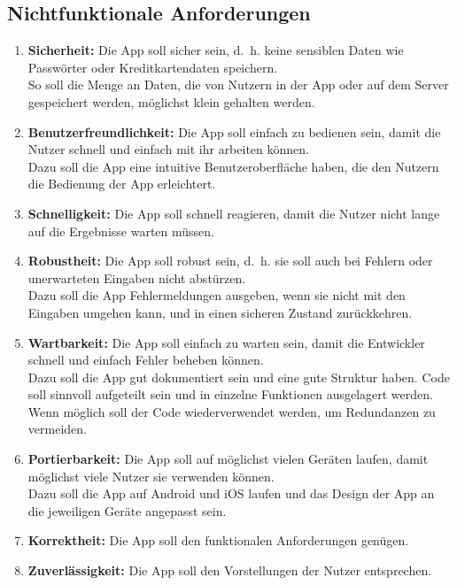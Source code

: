 \subsection{Nichtfunktionale Anforderungen}

\begin{enumerate}
	\item \textbf{Sicherheit:} Die App soll sicher sein, d. h. keine sensiblen Daten wie Passwörter oder Kreditkartendaten speichern.\\
	So soll die Menge an Daten, die von Nutzern in der App oder auf dem Server gespeichert werden, möglichst klein gehalten werden.
	\item \textbf{Benutzerfreundlichkeit:} Die App soll einfach zu bedienen sein, damit die Nutzer schnell und einfach mit ihr arbeiten können.\\
	Dazu soll die App eine intuitive Benutzeroberfläche haben, die den Nutzern die Bedienung der App erleichtert.
	\item \textbf{Schnelligkeit:} Die App soll schnell reagieren, damit die Nutzer nicht lange auf die Ergebnisse warten müssen.
	\item \textbf{Robustheit:} Die App soll robust sein, d. h. sie soll auch bei Fehlern oder unerwarteten Eingaben nicht abstürzen.\\
	Dazu soll die App Fehlermeldungen ausgeben, wenn sie nicht mit den Eingaben umgehen kann, und in einen sicheren Zustand zurückkehren.
	\item \textbf{Wartbarkeit:} Die App soll einfach zu warten sein, damit die Entwickler schnell und einfach Fehler beheben können.\\
	Dazu soll die App gut dokumentiert sein und eine gute Struktur haben.
	Code soll sinnvoll aufgeteilt sein und in einzelne Funktionen ausgelagert werden.
	Wenn möglich soll der Code wiederverwendet werden, um Redundanzen zu vermeiden.
	\item \textbf{Portierbarkeit:} Die App soll auf möglichst vielen Geräten laufen, damit möglichst viele Nutzer sie verwenden können.\\
	Dazu soll die App auf Android und iOS laufen und das Design der App an die jeweiligen Geräte angepasst sein.
	\item \textbf{Korrektheit:} Die App soll den funktionalen Anforderungen genügen.
	\item \textbf{Zuverlässigkeit:} Die App soll den Vorstellungen der Nutzer entsprechen.
\end{enumerate}

